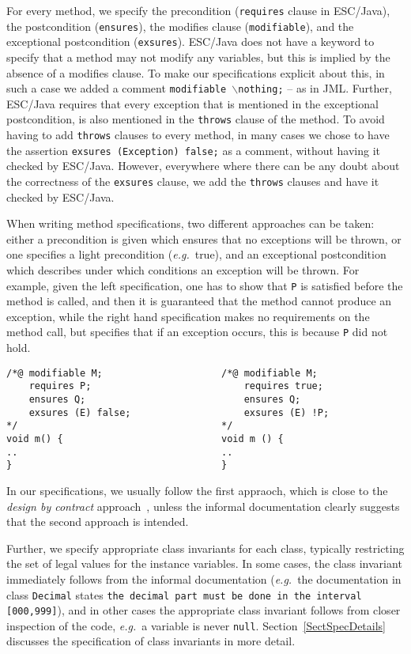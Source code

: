 \documentclass[a4paper]{llncs}
\newcommand{\noth}{\(\backslash\)\texttt{nothing}}
\begin{document}
For every method, we specify the precondition (\texttt{requires} clause
in ESC/Java), the postcondition (\texttt{ensures}), the modifies
clause (\texttt{modifiable}), and the exceptional postcondition
(\texttt{exsures}). ESC/Java does not have a keyword to specify that a
method may not modify any variables, but this is implied by the
absence of a modifies clause. To make our specifications explicit
about this, in such a case we added a comment
\texttt{modifiable \noth;} -- as in JML. Further, ESC/Java requires 
that every exception that is mentioned in the exceptional
postcondition, is also mentioned in the \texttt{throws} clause of the
method. To avoid having to add \texttt{throws} clauses to every method,
in many cases we chose to have the assertion \texttt{exsures
(Exception) false;} as a comment, without having it checked by
ESC/Java. However, everywhere where there can be any doubt about the
correctness of the \texttt{exsures} clause, we add the \texttt{throws}
clauses and have it checked by ESC/Java.

When writing method specifications, two different approaches can be
taken: either a precondition is given which ensures that no exceptions
will be thrown, or one specifies a light precondition
(\emph{e.g.}~true), and an exceptional postcondition which describes
under which conditions an exception will be thrown. For example, given
the left specification, one has to show that \texttt{P} is satisfied
before the method is called, and then it is guaranteed that the method
cannot produce an exception, while the right hand specification makes
no requirements on the method call, but specifies that if an exception
occurs, this is because \texttt{P} did not hold.
\begin{verbatim}
/*@ modifiable M;                     /*@ modifiable M;
    requires P;                           requires true;
    ensures Q;                            ensures Q;
    exsures (E) false;                    exsures (E) !P;
*/                                    */
void m() {                            void m () {
..                                    ..
}                                     }
\end{verbatim}

In our specifications, we usually follow the first appraoch, which
is close to the \emph{design by contract} approach~\cite{Meyer97},
unless the informal documentation clearly suggests that the second
approach is intended.

Further, we specify appropriate class invariants for each class,
typically restricting the set of legal values for the instance
variables. In some cases, the class invariant immediately follows from
the informal documentation (\emph{e.g.}~the documentation in class
\texttt{Decimal} states
\texttt{the decimal part must be done in the interval [000,999]}), and
in other cases the appropriate class invariant follows from closer
inspection of the code, \emph{e.g.}~a variable is never \texttt{null}.
Section~\ref{SectSpecDetails} discusses the specification of class
invariants in more detail.
\end{document}
